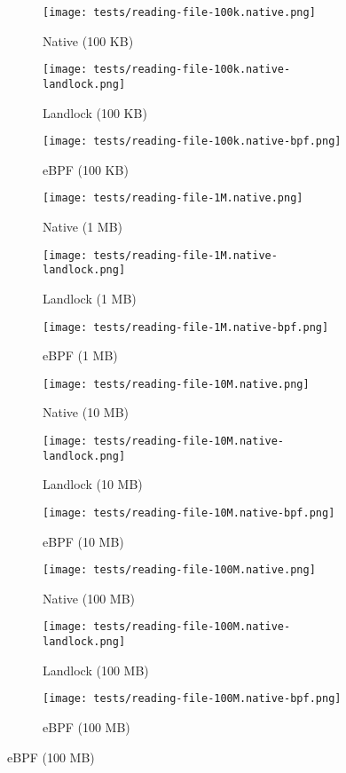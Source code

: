 \begin{figure}[ht!]
  \centering
  \begin{subfigure}[b]{0.32\textwidth}
    \centering
    \texttt{[image: tests/reading-file-100k.native.png]}
    \caption{Native (100 KB)}
  \end{subfigure}
  \begin{subfigure}[b]{0.32\textwidth}
    \centering
    \texttt{[image: tests/reading-file-100k.native-landlock.png]}
    \caption{Landlock (100 KB)}
  \end{subfigure}
  \begin{subfigure}[b]{0.32\textwidth}
    \centering
    \texttt{[image: tests/reading-file-100k.native-bpf.png]}
    \caption{eBPF (100 KB)}
  \end{subfigure}

  \begin{subfigure}[b]{0.32\textwidth}
    \centering
    \texttt{[image: tests/reading-file-1M.native.png]}
    \caption{Native (1 MB)}
  \end{subfigure}
  \begin{subfigure}[b]{0.32\textwidth}
    \centering
    \texttt{[image: tests/reading-file-1M.native-landlock.png]}
    \caption{Landlock (1 MB)}
  \end{subfigure}
  \begin{subfigure}[b]{0.32\textwidth}
    \centering
    \texttt{[image: tests/reading-file-1M.native-bpf.png]}
    \caption{eBPF (1 MB)}
  \end{subfigure}

  \begin{subfigure}[b]{0.32\textwidth}
    \centering
    \texttt{[image: tests/reading-file-10M.native.png]}
    \caption{Native (10 MB)}
  \end{subfigure}
  \begin{subfigure}[b]{0.32\textwidth}
    \centering
    \texttt{[image: tests/reading-file-10M.native-landlock.png]}
    \caption{Landlock (10 MB)}
  \end{subfigure}
  \begin{subfigure}[b]{0.32\textwidth}
    \centering
    \texttt{[image: tests/reading-file-10M.native-bpf.png]}
    \caption{eBPF (10 MB)}
  \end{subfigure}

  \begin{subfigure}[b]{0.32\textwidth}
    \centering
    \texttt{[image: tests/reading-file-100M.native.png]}
    \caption{Native (100 MB)}
  \end{subfigure}
  \begin{subfigure}[b]{0.32\textwidth}
    \centering
    \texttt{[image: tests/reading-file-100M.native-landlock.png]}
    \caption{Landlock (100 MB)}
  \end{subfigure}
  \begin{subfigure}[b]{0.32\textwidth}
    \centering
    \texttt{[image: tests/reading-file-100M.native-bpf.png]}
    \caption{eBPF (100 MB)}
  \end{subfigure}


\end{figure}
